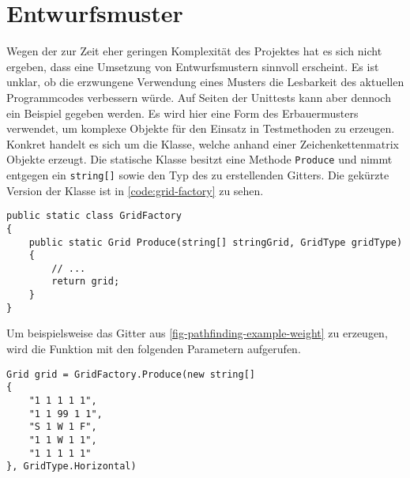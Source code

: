 \part{Entwurfsmuster}
Wegen der zur Zeit eher geringen Komplexität des Projektes hat es sich
nicht ergeben, dass eine Umsetzung von Entwurfsmustern sinnvoll erscheint.
Es ist unklar, ob die erzwungene Verwendung eines Musters
die Lesbarkeit des aktuellen Programmcodes verbessern würde.
Auf Seiten der Unittests kann aber dennoch ein Beispiel gegeben werden.
Es wird hier eine Form des Erbauermusters verwendet, um
komplexe Objekte für den Einsatz in Testmethoden zu erzeugen.
Konkret handelt es sich um die 
Klasse, welche anhand einer Zeichenkettenmatrix 
Objekte erzeugt.
Die statische Klasse besitzt eine Methode \lstinline{Produce}
und nimmt entgegen ein \lstinline{string[]} sowie den Typ des
zu erstellenden Gitters. Die gekürzte Version der Klasse ist in
\autoref{code:grid-factory} zu sehen.
\begin{lstlisting}[caption={{\inlinecode[\colorClasses]{GridFactory}} Klasse},
  label={code:grid-factory}]
public static class GridFactory
{
    public static Grid Produce(string[] stringGrid, GridType gridType)
    {
        // ...
        return grid;
    }
}
\end{lstlisting}
Um beispielsweise das Gitter aus \autoref{fig-pathfinding-example-weight}
zu erzeugen, wird die Funktion mit den folgenden Parametern aufgerufen.
\begin{lstlisting}[caption={Erzeugen eines Gitters durch
  die \lstinline{GridFactory} Klasse}, label={code:grid-factory-example}]
Grid grid = GridFactory.Produce(new string[]
{
    "1 1 1 1 1",
    "1 1 99 1 1",
    "S 1 W 1 F",
    "1 1 W 1 1",
    "1 1 1 1 1"
}, GridType.Horizontal)
\end{lstlisting}